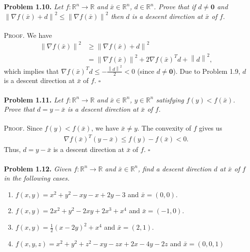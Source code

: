 \documentclass[a4paper]{article}
\numberwithin{equation}{section}
\begin{document}
\textbf{Problem 1.10.} \textit{Let $f: \mathbb{R}^n \to \mathbb{R}$ and $\bar x\in \mathbb{R}^n$, $d\in \mathbb{R}^n$. Prove that  if $d\ne \mathbf{0}$ and ${\left\| {\nabla f\left( {\bar x} \right) + d} \right\|^2} \le {\left\| {\nabla f\left( {\bar x} \right)} \right\|^2}$ then $d$ is a descent direction at $\bar x$ of $f$.}\\
\\
\textsc{Proof.} We have
\begin{align}
{\left\| {\nabla f\left( {\bar x} \right)} \right\|^2} &\ge {\left\| {\nabla f\left( {\bar x} \right) + d} \right\|^2}\\
& = {\left\| {\nabla f\left( {\bar x} \right)} \right\|^2} + 2\nabla f{\left( {\bar x} \right)^T}d + {\left\| d \right\|^2},
\end{align}
which implies that $\nabla f{\left( {\bar x} \right)^T}d \le  - \frac{{{{\left\| d \right\|}^2}}}{2} < 0$ (since $d\ne \mathbf{0}$). Due to Problem 1.9, $d$ is a descent direction at $\bar x$ of $f$. \hfill $\square$\\
\\
\textbf{Problem 1.11.} \textit{Let $f: \mathbb{R}^n \to \mathbb{R}$ and $\bar x\in \mathbb{R}^n$, $y\in \mathbb{R}^n$ satisfying $f\left(y\right) <f\left(\bar x\right)$. Prove that $d=y-\bar x$ is a descent direction at $\bar x$ of $f$.}\\
\\
\textsc{Proof.} Since $f\left(y\right) <f\left(\bar x\right)$, we have $\bar x\ne y$. The convexity of $f$ gives us 
\begin{align}
\nabla f{\left( {\bar x} \right)^T}\left( {y - \bar x} \right) \le f\left( y \right) - f\left( {\bar x} \right) < 0.
\end{align}
Thus, $d=y-\bar x$ is a descent direction at $\bar x$ of $f$. \hfill $\square$\\
\\
\textbf{Problem 1.12.} \textit{Given $f: \mathbb{R}^n \to \mathbb{R}$ and $\bar x \in \mathbb{R}^n$, find a descent direction $d$ at $\bar x$ of $f$ in the following cases.}
\begin{enumerate}
\item $f\left( {x,y} \right) = {x^2} + {y^2} - xy - x + 2y - 3$ and $\bar x = \left( {0,0} \right)$.
\item $f\left( {x,y} \right) = 2{x^2} + {y^2} - 2xy + 2{x^3} + {x^4}$ and $\bar x = \left( { - 1,0} \right)$.
\item $f\left( {x,y} \right) = \frac{1}{2}{\left( {x - 2y} \right)^2} + {x^4}$ and $\bar x = \left( {2,1} \right)$.
\item $f\left( {x,y,z} \right) = {x^2} + {y^2} + {z^2} - xy - zx + 2x - 4y - 2z$ and $\bar x = \left( {0,0,1} \right)$
\end{enumerate}
\end{document}
